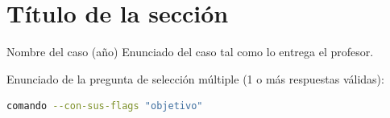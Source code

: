 \section{Título de la sección}

\begin{caso}{Nombre del caso (año)}
Enunciado del caso tal como lo entrega el profesor.
\end{caso}

\begin{fuentes}
\end{fuentes}

\begin{respuesta}
\end{respuesta}

\begin{mcq}{Enunciado de la pregunta de selección múltiple (1 o más respuestas válidas):}
\end{mcq}

\begin{lstlisting}[language=bash]
comando --con-sus-flags "objetivo"
\end{lstlisting}
\begin{analisis}
\end{analisis}
